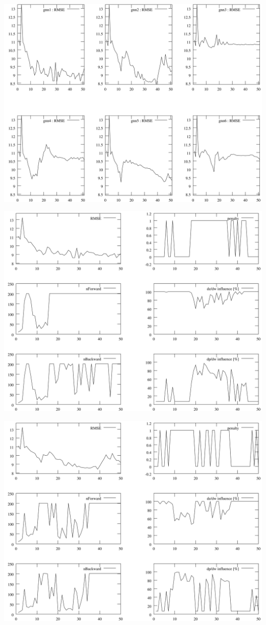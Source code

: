\documentclass{beamer}
\begin{document}
\begin{frame}
	\includegraphics[scale=0.065]{img/rmse1}
\end{frame}
\begin{frame}
	\includegraphics[scale=0.065]{img/gnn1_1}
\end{frame}
\begin{frame}
	\includegraphics[scale=0.065]{img/gnn1_2}
\end{frame}
\end{document}
